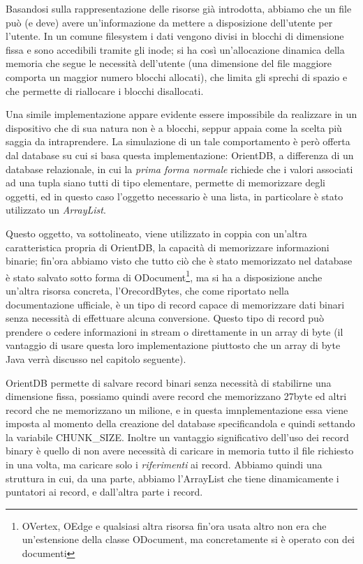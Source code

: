 Basandosi sulla rappresentazione delle risorse già introdotta, abbiamo che un file può (e deve) avere un'informazione da mettere a disposizione dell'utente per l'utente. In un comune filesystem i dati vengono divisi in blocchi di dimensione fissa e sono accedibili tramite gli inode; si ha così un'allocazione dinamica della memoria che segue le necessità dell'utente (una dimensione del file maggiore comporta un maggior numero blocchi allocati), che limita gli sprechi di spazio e che permette di riallocare i blocchi disallocati.

Una simile implementazione appare evidente essere impossibile da realizzare in un dispositivo che di sua natura non è a blocchi, seppur appaia come la scelta più saggia da intraprendere. La simulazione di un tale comportamento è però offerta dal database su cui si basa questa implementazione: OrientDB, a differenza di un database relazionale, in cui la \emph{prima forma normale} richiede che i valori associati ad una tupla siano tutti di tipo elementare, permette di memorizzare degli oggetti, ed in questo caso l'oggetto necessario è una lista, in particolare è stato utilizzato un \emph{ArrayList}.

Questo oggetto, va sottolineato, viene utilizzato in coppia con un'altra caratteristica propria di OrientDB, la capacità di memorizzare informazioni binarie; fin'ora abbiamo visto che tutto ciò che è stato memorizzato nel database è stato salvato sotto forma di  ODocument\footnote{OVertex, OEdge e qualsiasi altra risorsa fin'ora usata altro non era che un'estensione della classe ODocument, ma concretamente si è operato con dei documenti}, ma si ha a disposizione anche un'altra risorsa concreta, l'OrecordBytes, che come riportato nella documentazione ufficiale, è un tipo di record capace di memorizzare dati binari senza necessità di effettuare alcuna conversione. Questo tipo di record può prendere o cedere informazioni in stream o direttamente in un array di byte (il vantaggio di usare questa loro implementazione piuttosto che un array di byte Java verrà discusso nel capitolo seguente).

OrientDB permette di salvare record binari senza necessità di stabilirne una dimensione fissa, possiamo quindi avere record che memorizzano 27byte ed altri record che ne memorizzano un milione, e in questa imnplementazione essa viene imposta al momento della creazione del database specificandola e quindi settando la variabile CHUNK\_SIZE. Inoltre un vantaggio significativo dell'uso dei record binary è quello di non avere necessità di caricare in memoria tutto il file richiesto in una volta, ma caricare solo i \emph{riferimenti} ai record. Abbiamo quindi una struttura in cui, da una parte, abbiamo l'ArrayList che tiene dinamicamente i puntatori ai record, e dall'altra parte i record.

